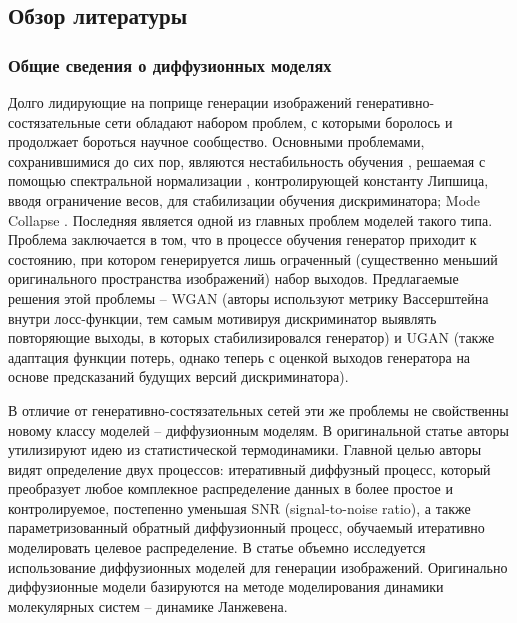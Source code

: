 \subsection{Обзор литературы}

\subsubsection{Общие сведения о диффузионных моделях}
\par
Долго лидирующие на поприще генерации изображений генеративно-состязательные сети обладают набором проблем, с которыми боролось и продолжает бороться научное сообщество. Основными проблемами, сохранившимися до сих пор, являются нестабильность обучения \cite{kodali2017convergence}, решаемая с помощью спектральной нормализации \cite{miyato2018spectral}, контролирующей константу Липшица, вводя ограничение весов, для стабилизации обучения дискриминатора; Mode Collapse \cite{thanhtung2020catastrophic}. Последняя является одной из главных проблем моделей такого типа. Проблема заключается в том, что в процессе обучения генератор приходит к состоянию, при котором генерируется лишь ограченный (существенно меньший оригинального пространства изображений) набор выходов. Предлагаемые решения этой проблемы -- WGAN \cite{arjovsky2017wasserstein} (авторы используют метрику Вассерштейна внутри лосс-функции, тем самым мотивируя дискриминатор выявлять повторяющие выходы, в которых стабилизировался генератор) и UGAN \cite{metz2017unrolled} (также адаптация функции потерь, однако теперь с оценкой выходов генератора на основе предсказаний будущих версий дискриминатора).

\par
В отличие от генеративно-состязательных сетей эти же проблемы не свойственны новому классу моделей -- диффузионным моделям. В оригинальной статье \cite{sohldickstein2015deep} авторы утилизируют идею из статистической термодинамики. Главной целью авторы видят определение двух процессов: итеративный диффузный процесс, который преобразует любое комплекное распределение данных в более простое и контролируемое, постепенно уменьшая SNR (signal-to-noise ratio), а также параметризованный обратный диффузионный процесс, обучаемый итеративно моделировать целевое распределение. В статье \cite{ho2020denoising} объемно исследуется использование диффузионных моделей для генерации изображений. Оригинально диффузионные модели базируются на методе моделирования динамики молекулярных систем -- динамике Ланжевена. 

